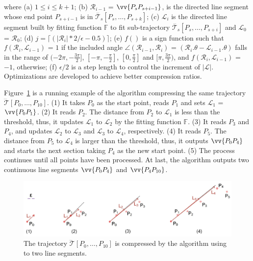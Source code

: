 \ni where (a) $1 \le i \le k+1$; (b) $\mathcal{R}_{i-1}$ = $\vv{P_sP_{s+i-1}}$, is the directed line segment whose end point $P_{s+i-1}$ is in $\dddot{\mathcal{T}_s}[P_s, \ldots, P_{s+k}]$; (c) $\mathcal{L}_{i}$ is the directed line segment built by fitting function $\mathbb{F}$ to fit sub-trajectory $\dddot{\mathcal{T}_s}[P_s, \ldots, P_{s+i}]$ and $\mathcal{L}_{0}$ = $\mathcal{R}_{0}$; (d) $j = \lceil(|\mathcal{R}_{i}|*2/\epsilon - 0.5)\rceil$; (e) $f()$ is a sign function such that $ f(\mathcal{R}_i,\mathcal{L}_{i-1})$ = $1$ if the included angle $\angle(\mathcal{R}_{i-1}, \mathcal{R}_{i})$ = $(\mathcal{R}_i.\theta - \mathcal{L}_{i-1}.\theta)$ falls in the range of $(-2\pi, -\frac{3\pi}{2}]$, $[-\pi, -\frac{\pi}{2}]$, $[0, \frac{\pi}{2}]$ and $[\pi, \frac{3\pi}{2})$, and $f(\mathcal{R}_i,\mathcal{L}_{i-1})$ = $-1$, otherwise; (f) $\epsilon/2$ is a step length to control the increment of $|\mathcal{L}|$.
%
Optimizations are developed to achieve better compression ratios.


\begin{example}
	\label{exm-alg-operb}
	Figure~\ref{fig:operb} is a running example of the \operb algorithm compressing the same trajectory $\dddot{\mathcal{T}}[P_0, \ldots, P_{10}]$.
	(1) It takes $P_0$ as the start point, reads $P_1$ and sets $\mathcal{L}_1$ = $\vv{P_0P_1}$.
	(2) It reads $P_2$. The distance from $P_2$ to $\mathcal{L}_1$ is less than the threshold, thus, it updates $\mathcal{L}_1$  to $\mathcal{L}_2$ by the fitting function $\mathbb{F}$.
	(3) It reads $P_3$ and $P_4$, and updates $\mathcal{L}_2$ to $\mathcal{L}_3$ and $\mathcal{L}_3$ to $\mathcal{L}_4$, respectively.
	(4) It reads $P_5$. The distance from $P_5$ to $\mathcal{L}_4$ is larger than the threshold, thus, it outputs $\vv{P_0P_4}$ and starts the next section taking $P_4$ as the new start point.
	(5) The process continues until all points have been processed. At last, the algorithm outputs two continuous line segments $\vv{P_0P_4}$ and $\vv{P_4P_{10}}$.
\end{example}


\begin{figure}[tb!]
	\centering
	\includegraphics[scale=0.66]{Figures/Fig-OPER.jpg}
	\vspace{-1ex}
	\caption{\small The trajectory $\dddot{\mathcal{T}}[P_0, \ldots, P_{10}]$ is compressed by the \operb algorithm using \ped to two line segments.}
	\vspace{-1ex}
	\label{fig:operb}
\end{figure}



